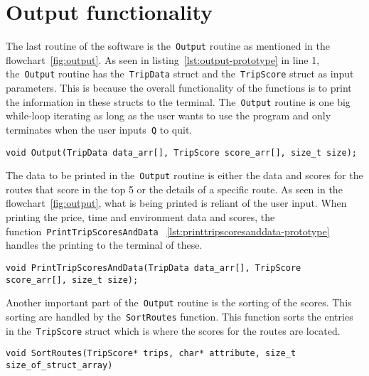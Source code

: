 \section{Output functionality}\label{sec:output-functionality}

The last routine of the software is the~\texttt{Output} routine as mentioned in the flowchart~\ref{fig:output}.
As seen in listing~\ref{lst:output-prototype} in line 1, the~\texttt{Output} routine has the~\texttt{TripData} struct
and the~\texttt{TripScore} struct as input parameters.
This is because the overall functionality of the functions is to print the information in these structs to the terminal.
The~\texttt{Output} routine is one big while-loop iterating as long as the user wants to use the program and only
terminates when the user inputs~\texttt{Q} to quit.

\begin{lstlisting}[caption={Function prototype for~\texttt{Output}}, label={lst:output-prototype}, captionpos=b]
void Output(TripData data_arr[], TripScore score_arr[], size_t size);
\end{lstlisting}

The data to be printed in the~\texttt{Output} routine is either the data and scores for the routes that score in the top
5 or the details of a specific route.
As seen in the flowchart~\ref{fig:output}, what is being printed is reliant of the user input.
When printing the price, time and environment data and scores, the function~\texttt{PrintTripScoresAndData}
~\ref{lst:printtripscoresanddata-prototype} handles the printing to the terminal of these.

\begin{lstlisting}[caption={Function prototype for~\texttt{PrintTripScoresAndData}},
    label={lst:printtripscoresanddata-prototype}, captionpos=b]
void PrintTripScoresAndData(TripData data_arr[], TripScore score_arr[], size_t size);
\end{lstlisting}


Another important part of the~\texttt{Output} routine is the sorting of the scores.
This sorting are handled by the~\texttt{SortRoutes} function.
This function sorts the entries in the~\texttt{TripScore} struct which is where the scores for the routes are located.


\begin{lstlisting}[caption={Function prototype for~\texttt{SortRoutes}}, label={lst:sortroutes-prototype},
    captionpos=b]
void SortRoutes(TripScore* trips, char* attribute, size_t size_of_struct_array)
\end{lstlisting}
